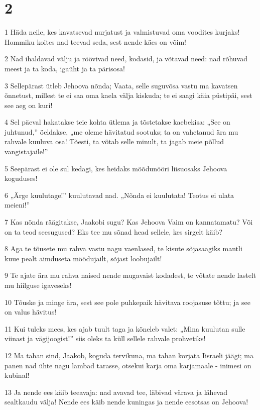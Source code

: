 \chapter{2}

\par 1 Häda neile, kes kavatsevad nurjatust ja valmistuvad oma voodites kurjaks! Hommiku koites nad teevad seda, sest nende käes on võim!
\par 2 Nad ihaldavad välju ja röövivad need, kodasid, ja võtavad need: nad rõhuvad meest ja ta koda, igaüht ja ta pärisosa!
\par 3 Sellepärast ütleb Jehoova nõnda; Vaata, selle suguvõsa vastu ma kavatsen õnnetust, millest te ei saa oma kaela välja kiskuda; te ei saagi käia püstipäi, sest see aeg on kuri!
\par 4 Sel päeval hakatakse teie kohta ütlema ja tõstetakse kaebekisa: „See on juhtunud,” öeldakse, „me oleme hävitatud sootuks; ta on vahetanud ära mu rahvale kuuluva osa! Tõesti, ta võtab selle minult, ta jagab meie põllud vangistajaile!”
\par 5 Seepärast ei ole sul kedagi, kes heidaks mõõdunööri liisuosaks Jehoova koguduses!
\par 6 „Ärge kuulutage!” kuulutavad nad. „Nõnda ei kuulutata! Teotus ei ulata meieni!”
\par 7 Kas nõnda räägitakse, Jaakobi sugu? Kas Jehoova Vaim on kannatamatu? Või on ta teod seesugused? Eks tee mu sõnad head sellele, kes sirgelt käib?
\par 8 Aga te tõusete mu rahva vastu nagu vaenlased, te kisute sõjasaagiks mantli kuue pealt aimduseta möödujailt, sõjast loobujailt!
\par 9 Te ajate ära mu rahva naised nende mugavaist kodadest, te võtate nende lastelt mu hiilguse igaveseks!
\par 10 Tõuske ja minge ära, sest see pole puhkepaik hävitava roojasuse tõttu; ja see on valus hävitus!
\par 11 Kui tuleks mees, kes ajab tuult taga ja kõneleb valet: „Mina kuulutan sulle viinast ja vägijoogist!” siis oleks ta küll sellele rahvale prohvetiks!
\par 12 Ma tahan sind, Jaakob, koguda tervikuna, ma tahan korjata Iisraeli jäägi; ma panen nad ühte nagu lambad tarasse, otsekui karja oma karjamaale - inimesi on kubinal!
\par 13 Ja nende ees käib teeavaja: nad avavad tee, läbivad värava ja lähevad sealtkaudu välja! Nende ees käib nende kuningas ja nende eesotsas on Jehoova!


